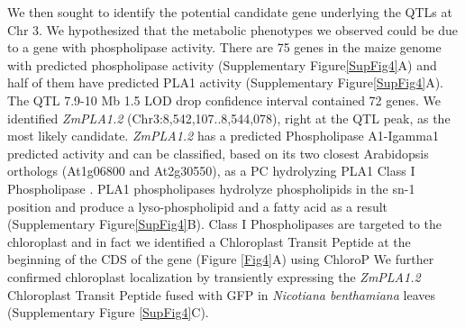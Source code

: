 \documentclass[9pt,twocolumn,twoside,lineno]{BioRxiv}
\begin{document}
We then sought to identify the potential candidate gene underlying the QTLs at Chr 3.
We hypothesized that the metabolic phenotypes we observed could be due to a gene with phospholipase activity. 
There are 75 genes in the maize genome with predicted phospholipase activity (Supplementary Figure\ref{SupFig4}A) and half of them have predicted PLA1 activity (Supplementary Figure\ref{SupFig4}A).  
The QTL 7.9-10 Mb 1.5 LOD drop confidence interval contained 72 genes. 
We identified \textit{ZmPLA1.2} (Chr3:8,542,107..8,544,078), right at the QTL peak, as the most likely candidate. 
\textit{ZmPLA1.2} has a predicted Phospholipase A1-Igamma1 predicted activity and can be classified, based on its two closest Arabidopsis orthologs (At1g06800 and At2g30550), as a PC hydrolyzing PLA1 Class I Phospholipase \cite{Ryu2004-iv}. 
PLA1 phospholipases hydrolyze phospholipids in the sn-1 position and produce a lyso-phospholipid and a fatty acid as a result (Supplementary Figure\ref{SupFig4}B). 
Class I Phospholipases are targeted to the chloroplast and in fact we identified a Chloroplast Transit Peptide at the beginning of the CDS of the gene (Figure \ref{Fig4}A) using ChloroP \cite{Emanuelsson1999-rs} 
We further confirmed chloroplast localization by transiently expressing  the \textit{ZmPLA1.2} Chloroplast Transit Peptide fused with GFP in \textit{Nicotiana benthamiana} leaves (Supplementary Figure \ref{SupFig4}C).
\end{document}
